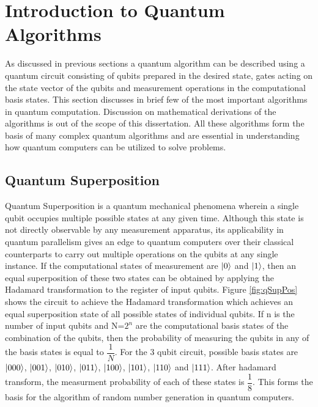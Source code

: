 \documentclass[english,a4paper,11pt,oneside,onecolumn]{book}
\begin{document}
\section{Introduction to Quantum Algorithms}
\label{sec:qAlgo}
As discussed in previous sections a quantum algorithm can be described using a quantum circuit consisting of qubits prepared in the desired state, gates acting on the state vector of the qubits and measurement operations in the computational basis states. This section discusses in brief few of the most important algorithms in quantum computation. Discussion on mathematical derivations of the algorithms is out of the scope of this dissertation. All these algorithms \cite{emma_2011_an} form the basis of many complex quantum algorithms and are essential in understanding how quantum computers can be utilized to solve problems.

\subsection{Quantum Superposition}
\label{sec:qSupPos}
Quantum Superposition \cite{nielsen_2019_quantum} is a quantum mechanical phenomena wherein a single qubit occupies multiple possible states at any given time. Although this state is not directly observable by any measurement apparatus, its applicability in quantum parallelism gives an edge to quantum computers over their classical counterparts to carry out multiple operations on the qubits at any single instance. If the computational states of measurement are \(\ket{0}\) and \(\ket{1}\), then an equal superposition of these two states can be obtained by applying the Hadamard transformation to the register of input qubits. Figure \ref{fig:qSupPos} shows the circuit to achieve the Hadamard transformation which achieves an equal superposition state of all possible states of individual qubits. If n is the number of input qubits and N=\(2^n\) are the computational basis states of the combination of the qubits, then the probability of measuring the qubits in any of the basis states is equal to \(\dfrac{1}{N}\). For the 3 qubit circuit, possible basis states are \(\ket{000}\), \(\ket{001}\), \(\ket{010}\), \(\ket{011}\), \(\ket{100}\), \(\ket{101}\), \(\ket{110}\) and \(\ket{111}\). After hadamard transform, the measurment probability of each of these states is \(\dfrac{1}{8}\). This forms the basis for the algorithm of random number generation in quantum computers.
\end{document}
